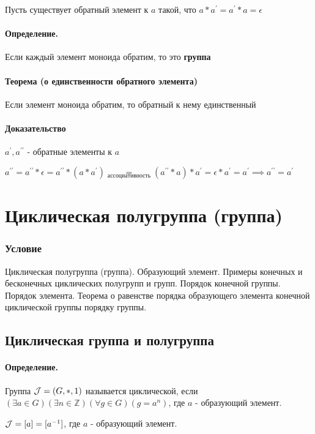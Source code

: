 \documentclass{report}
\begin{document}
Пусть существует обратный элемент к $a$ такой, что $a * a^{\prime} = a^{\prime} * a = \epsilon$
\paragraph*{Определение.}
Если каждый элемент моноида обратим, то это {\bf группа}

\paragraph*{Теорема (о единственности обратного элемента)}
Если элемент моноида обратим, то обратный к нему единственный
\paragraph*{Доказательство}
$a^{\prime}, a^{\prime\prime}$ - обратные элементы к $a$

$a^{\prime\prime} = a^{\prime\prime} * \epsilon =
	a^{\prime\prime} * (a * a^{\prime}) \underset{ассоциативность}{=}
	(a^{\prime\prime} * a) * a^{\prime} = \epsilon * a^{\prime} = a^{\prime} \implies
	a^{\prime\prime} = a^{\prime}$

\newpage

\section{Циклическая полугруппа (группа)}
\subsubsection{Условие}
Циклическая полугруппа (группа). Образующий элемент. Примеры конечных и
бесконечных циклических полугрупп и групп. Порядок конечной группы. Порядок
элемента. Теорема о равенстве порядка образующего элемента конечной циклической
группы порядку группы.

\subsection{Циклическая группа и полугруппа}
\paragraph*{Определение.} Группа ${\cal J} = (G, *, 1)$ называется циклической,
если $(\exists a \in G)(\exists n \in \mathbb{Z})(\forall g \in G)(g = a^{n})$,
где $a$ - образующий элемент.


${\cal J} = [a] = [a^{-1}]$, где $a$ - образующий элемент.
\end{document}
